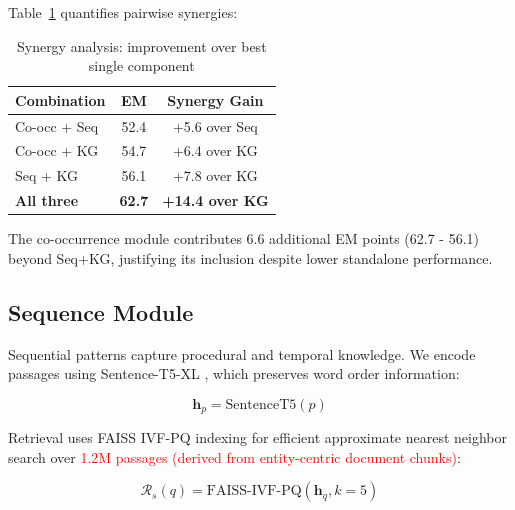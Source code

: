 \documentclass[10pt,twocolumn]{article}
\newcommand{\revisioncritical}[1]{\textcolor{red}{#1}}
\begin{document}
Table~\ref{tab:synergy} quantifies pairwise synergies:

\begin{table}[h]
\centering
\caption{Synergy analysis: improvement over best single component}
\label{tab:synergy}
\small
\begin{tabular}{@{}lcc@{}}
\toprule
\textbf{Combination} & \textbf{EM} & \textbf{Synergy Gain} \\
\midrule
Co-occ + Seq & 52.4 & +5.6 over Seq \\
Co-occ + KG & 54.7 & +6.4 over KG \\
Seq + KG & 56.1 & +7.8 over KG \\
\textbf{All three} & \textbf{62.7} & \textbf{+14.4 over KG} \\
\bottomrule
\end{tabular}
\end{table}

The co-occurrence module contributes 6.6 additional EM points (62.7 - 56.1) beyond Seq+KG, justifying its inclusion despite lower standalone performance.


\subsection{Sequence Module}

Sequential patterns capture procedural and temporal knowledge. We encode passages using Sentence-T5-XL \cite{ni2022sentence_t5}, which preserves word order information:

\begin{equation}
\mathbf{h}_p = \text{SentenceT5}(p)
\end{equation}

Retrieval uses FAISS IVF-PQ indexing \cite{johnson2019faiss} for efficient approximate nearest neighbor search over \revisioncritical{1.2M passages (derived from entity-centric document chunks)}:

\begin{equation}
\mathcal{R}_s(q) = \text{FAISS-IVF-PQ}(\mathbf{h}_q, k=5)
\end{equation}
\end{document}
